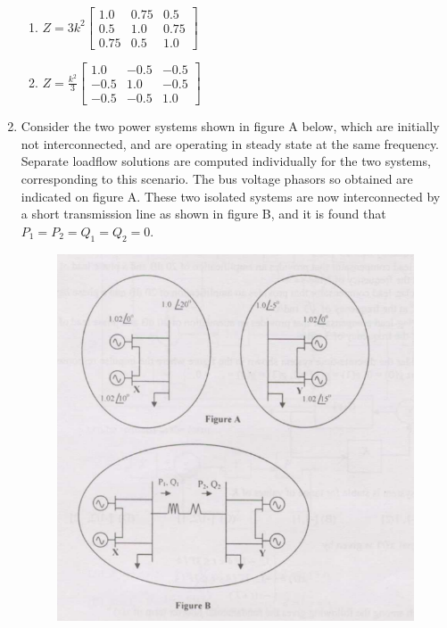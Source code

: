 \documentclass[journal]{IEEEtran}
\numberwithin{equation}{enumi}
\numberwithin{figure}{enumi}
\begin{document}
\begin{enumerate}
\begin{multicols}{2}
\begin{enumerate}
        \item $ Z = 3k^2 \begin{bmatrix} 1.0 & 0.75 & 0.5 \\ 0.5 & 1.0 & 0.75 \\ 0.75 & 0.5 & 1.0 \end{bmatrix} $
        \item $ Z = \frac{k^2}{3} \begin{bmatrix} 1.0 & -0.5 & -0.5 \\ -0.5 & 1.0 & -0.5 \\ -0.5 & -0.5 & 1.0 \end{bmatrix} $
    \end{enumerate}
    \end{multicols}
    \bigskip
    \item Consider the two power systems shown in figure A below, which are initially not interconnected, and are operating in steady state at the same frequency. Separate loadflow solutions are computed individually for the two systems, corresponding to this scenario. The bus voltage phasors so obtained are indicated on figure A. These two isolated systems are now interconnected by a short transmission line as shown in figure B, and it is found that $P_1 = P_2 = Q_1 = Q_2 = 0$.
    \begin{figure}[!ht]
    \centering
    \includegraphics[width=\linewidth]{figs/15.png}

\end{figure}
\end{enumerate}
\end{document}
